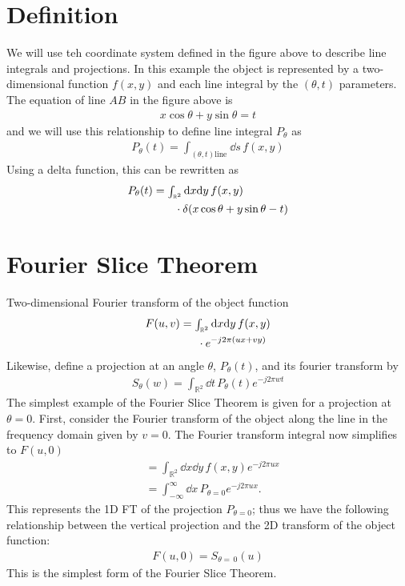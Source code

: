 \section{Definition}
We will use teh coordinate system defined in the figure above to describe line integrals and projections. In this example the object is represented by a two-dimensional function $f(x,y)$ and each line integral by the $(\theta,t)$ parameters. The equation of line $AB$ in the figure above is
\begin{gather*}
	x\cos\theta+y\sin\theta=t
\end{gather*}
and we will use this relationship to define line integral $P_{\theta}$ as
\begin{gather*}
	P_{\theta}(t)={\scriptstyle\int_{(\theta,t)\text{line}}}^{}\!\dd{s}\, f(x,y)
\end{gather*}
Using a delta function, this can be rewritten as
\begin{align*}
	P_{\theta}(t)&={\scriptstyle\int_{\mathbb{R}^2}}\dd{x}\!\dd{y}\, f(x,y)\\
	&\hphantom{\int_{\mathbb{R}^2}\cdot}\cdot\delta(x\cos\theta+y\sin\theta-t)
\end{align*}
\section{Fourier Slice Theorem}
Two-dimensional Fourier transform of the object function
\begin{align*}
	F(u,v)&={\scriptstyle\int_{\mathbb{R}^2}^{}}\dd{x}\!\dd{y}\, f(x,y)\\
	&\hphantom{{\scriptstyle\int_{\mathbb{R}^2}^{}}\cdot}\cdot e^{-j2\pi(ux+vy)}
\end{align*}
Likewise, define a projection at an angle $\theta$, $P_{\theta}(t)$, and its fourier transform by 
\begin{gather*}
	S_{\theta}(w)={\scriptstyle\int_{\mathbb{R}^2}^{}}\dd{t}\, P_{\theta}(t)e^{-j2\pi wt}
\end{gather*}
The simplest example of the Fourier Slice Theorem is given for a projection at $\theta=0$. First, consider the Fourier transform of the object along the line in the frequency domain given by $v=0$. The Fourier transform integral now simplifies to $F(u,0)$
\begin{align*}
	&={\scriptstyle\int_{\mathbb{R}^2}^{}}\dd{x}\!\dd{y}\, f(x,y)e^{-j2\pi ux}\\
	&={\scriptstyle\int_{-\infty}^{\infty}}\dd{x}\, P_{\theta=0}e^{-j2\pi ux}.
\end{align*}
This represents the 1D FT of the projection $P_{\theta=0}$; thus we have the following relationship between the vertical projection and the 2D transform of the object function:
\begin{gather*}
	F(u,0)=S_{\theta=\,0}(u)
\end{gather*}
This is the simplest form of the Fourier Slice Theorem.
